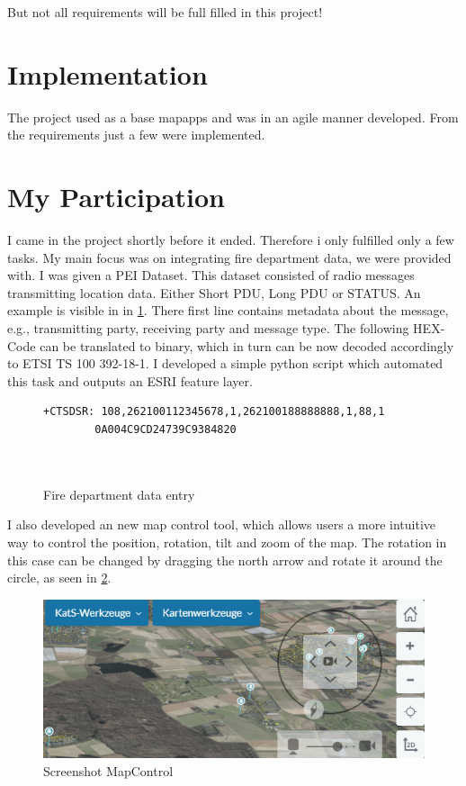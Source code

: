 \documentclass[11pt, titlepage, a4paper]{article}
\begin{document}
But not all requirements will be full filled in this project!

\section{Implementation}
The project used as a base mapapps and was in an agile manner developed. From the requirements just a few were implemented.

\section{My Participation}
I came in the project shortly before it ended. Therefore i only fulfilled only a few tasks.
My main focus was on integrating fire department data, we were provided with. I was given a PEI Dataset. This dataset consisted of radio messages transmitting location data. Either Short PDU, Long PDU or STATUS. An example is visible in in \ref{fig:pei}. There first line contains metadata about the message, e.g., transmitting party, receiving party and message type.
The following HEX-Code can be translated to binary, which in turn can be now decoded accordingly to ETSI TS 100 392-18-1. I developed a simple python script which automated this task and outputs an ESRI feature layer.  
\begin{figure}[H]
	\caption{Fire department data entry}
	\label{fig:pei}
	\begin{lstlisting}[frame=single]
        +CTSDSR: 108,262100112345678,1,262100188888888,1,88,1
		0A004C9CD24739C9384820

        
        \end{lstlisting}
	\centering
\end{figure}

I also developed an new map control tool, which allows users a more intuitive way to control the position, rotation, tilt and zoom of  the map. The rotation in this case can be changed by dragging the north arrow and rotate it around the circle, as seen in \ref{fig:mapcontrol}.
\begin{figure}[H]
	\caption{Screenshot MapControl}
	\label{fig:mapcontrol}
	\includegraphics[width=16cm]{dzgefahr_mapcontrol.png}
	\centering
\end{figure}
\end{document}
